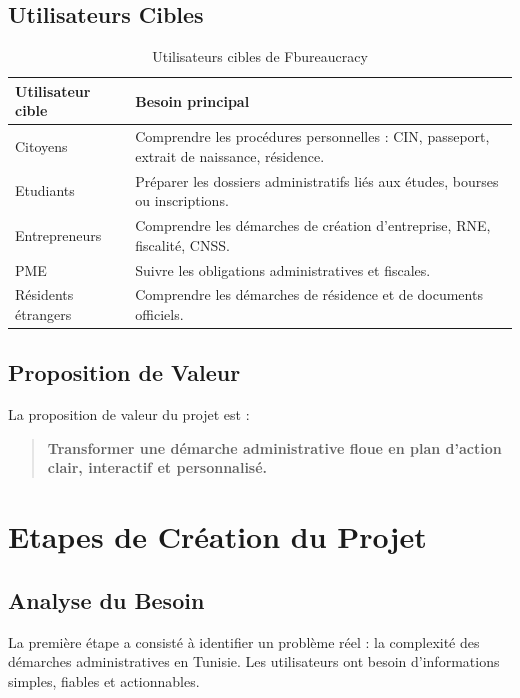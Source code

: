 \documentclass[12pt,a4paper]{report}
\begin{document}
\section{Utilisateurs Cibles}

\begin{table}[H]
\centering
\begin{tabular}{|p{4cm}|p{9cm}|}
\hline
\textbf{Utilisateur cible} & \textbf{Besoin principal} \\
\hline
Citoyens & Comprendre les procédures personnelles : CIN, passeport, extrait de naissance, résidence. \\
\hline
Etudiants & Préparer les dossiers administratifs liés aux études, bourses ou inscriptions. \\
\hline
Entrepreneurs & Comprendre les démarches de création d'entreprise, RNE, fiscalité, CNSS. \\
\hline
PME & Suivre les obligations administratives et fiscales. \\
\hline
Résidents étrangers & Comprendre les démarches de résidence et de documents officiels. \\
\hline
\end{tabular}
\caption{Utilisateurs cibles de Fbureaucracy}
\end{table}

\section{Proposition de Valeur}

La proposition de valeur du projet est :

\begin{quote}
\textbf{Transformer une démarche administrative floue en plan d'action clair, interactif et personnalisé.}
\end{quote}


\chapter{Etapes de Création du Projet}

\section{Analyse du Besoin}

La première étape a consisté à identifier un problème réel : la complexité des démarches administratives en Tunisie. Les utilisateurs ont besoin d'informations simples, fiables et actionnables.
\end{document}
